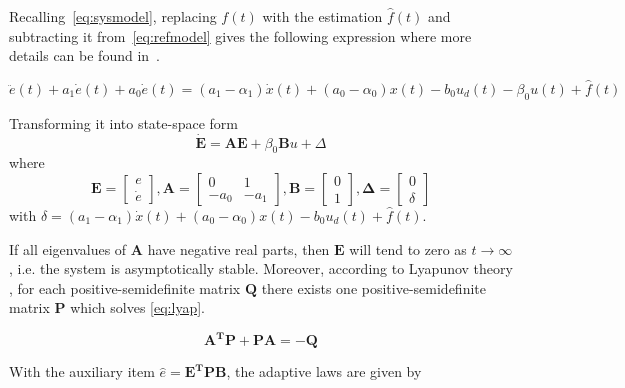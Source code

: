 Recalling~\eqref{eq:sysmodel}, replacing $f(t)$ with the estimation $\hat{f}(t)$ and subtracting it from~\eqref{eq:refmodel} gives the following expression where more details can be found in~\citep{Qingson:2016}.

\begin{equation}
  \ddot{e}(t) + a_1\dot{e}(t) + a_0\dot{e}(t) =  (a_1-\alpha_1)\dot{x}(t) + (a_0-\alpha_0)x(t) - b_0u_d(t) - \beta_0u(t) + \hat{f}(t)
\end{equation}

Transforming it into state-space form
\begin{equation}
  \label{eq:stateSpaceError}
  \mathbf{\dot{E} = AE} + \beta_0\mathbf{B}u + \Delta
\end{equation}
where
\begin{equation}
  \label{eq:matrices}
  \mathbf{E} =
    \begin{bmatrix}
       e\\[0.3em]
       \dot{e}
     \end{bmatrix},
  \mathbf{A} =
    \begin{bmatrix}
       0 & 1\\[0.3em]
       -a_0 & -a_1
     \end{bmatrix},
  \mathbf{B} =
    \begin{bmatrix}
        0\\[0.3em]
        1
    \end{bmatrix},
    \mathbf{\Delta} =
      \begin{bmatrix}
          0\\[0.3em]
          \delta
      \end{bmatrix}
\end{equation}
with $\delta = (a_1-\alpha_1)\dot{x}(t) + (a_0-\alpha_0)x(t) - b_0u_d(t) + \hat{f}(t)$.

If all eigenvalues of $\mathbf{A}$ have negative real parts, then $\mathbf{E}$ will tend to zero as  $t \to \infty$, i.e. the system is asymptotically stable. Moreover, according to Lyapunov theory \citep{Ljung:2003}, for each positive-semidefinite matrix $\mathbf{Q}$ there exists one positive-semidefinite matrix $\mathbf{P}$ which solves \eqref{eq:lyap}.

\begin{equation}
  \label{eq:lyap}
  \mathbf{A^TP + PA = -Q}
\end{equation}

With the auxiliary item $\hat{e} = \mathbf{E^TPB}$, the adaptive laws are given by

